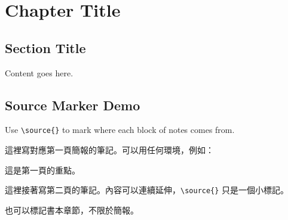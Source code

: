 \chapter{Chapter Title}
\section{Section Title}

Content goes here.

\section{Source Marker Demo}

Use \verb|\source{}| to mark where each block of notes comes from.


這裡寫對應第一頁簡報的筆記。可以用任何環境，例如：

\begin{note}
	這是第一頁的重點。
\end{note}


這裡接著寫第二頁的筆記。內容可以連續延伸，\verb|\source{}| 只是一個小標記。


也可以標記書本章節，不限於簡報。
